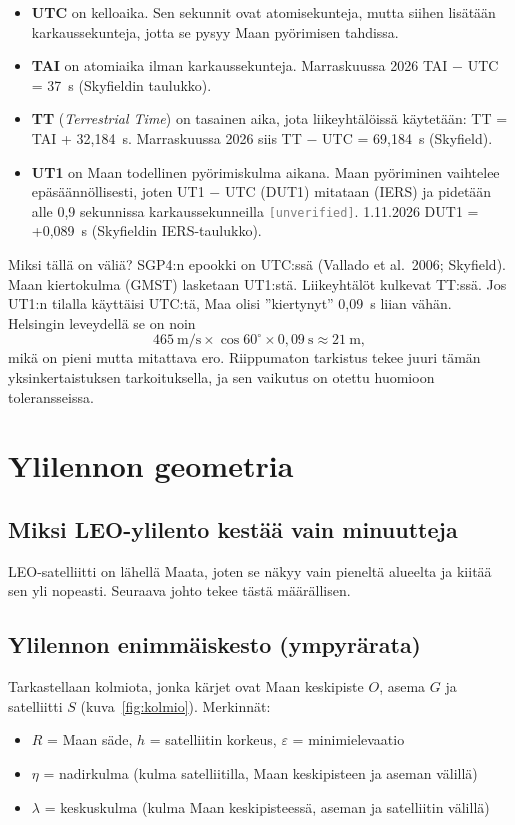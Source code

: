 \documentclass[a4paper,11pt]{article}
\newcommand{\unverified}[1][]{\textcolor{gray}{\texttt{[unverified#1]}}}
\begin{document}
\begin{itemize}
  \item \textbf{UTC} on kelloaika. Sen sekunnit ovat atomisekunteja, mutta siihen lisätään karkaussekunteja, jotta se pysyy Maan pyörimisen tahdissa.
  \item \textbf{TAI} on atomiaika ilman karkaussekunteja. Marraskuussa 2026 TAI $-$ UTC = 37~s (Skyfieldin taulukko).
  \item \textbf{TT} (\emph{Terrestrial Time}) on tasainen aika, jota liikeyhtälöissä käytetään: TT = TAI + 32,184~s. Marraskuussa 2026 siis TT $-$ UTC = 69,184~s (Skyfield).
  \item \textbf{UT1} on Maan todellinen pyörimiskulma aikana. Maan pyöriminen vaihtelee epäsäännöllisesti, joten UT1 $-$ UTC (DUT1) mitataan (IERS) ja pidetään alle 0,9 sekunnissa karkaussekunneilla \unverified. 1.11.2026 DUT1 = +0,089~s (Skyfieldin IERS-taulukko).
\end{itemize}

Miksi tällä on väliä? SGP4:n epookki on UTC:ssä (Vallado et al.\ 2006; Skyfield). Maan kiertokulma (GMST) lasketaan UT1:stä. Liikeyhtälöt kulkevat TT:ssä. Jos UT1:n tilalla käyttäisi UTC:tä, Maa olisi ”kiertynyt” 0,09~s liian vähän. Helsingin leveydellä se on noin
\[
465\ \text{m/s} \times \cos 60^\circ \times 0,09\ \text{s} \approx 21\ \text{m},
\]
mikä on pieni mutta mitattava ero. Riippumaton tarkistus tekee juuri tämän yksinkertaistuksen tarkoituksella, ja sen vaikutus on otettu huomioon toleransseissa.

\section{Ylilennon geometria}\label{sec:geometria}

\subsection{Miksi LEO-ylilento kestää vain minuutteja}

LEO-satelliitti on lähellä Maata, joten se näkyy vain pieneltä alueelta ja kiitää sen yli nopeasti. Seuraava johto tekee tästä määrällisen.

\subsection{Ylilennon enimmäiskesto (ympyrärata)}

Tarkastellaan kolmiota, jonka kärjet ovat Maan keskipiste $O$, asema $G$ ja satelliitti $S$ (kuva~\ref{fig:kolmio}). Merkinnät:
\begin{itemize}
  \item $R$ = Maan säde, $h$ = satelliitin korkeus, $\varepsilon$ = minimielevaatio
  \item $\eta$ = nadirkulma (kulma satelliitilla, Maan keskipisteen ja aseman välillä)
  \item $\lambda$ = keskuskulma (kulma Maan keskipisteessä, aseman ja satelliitin välillä)
\end{itemize}
\end{document}
